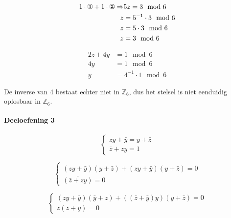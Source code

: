 \documentclass[12pt]{article}
\newcommand{\ov}[1]{\bar{#1}}
\begin{document}

	\begin{align}
		1 \cdot \text{\ding{172}} + 1 \cdot \text{\ding{173}} \Rightarrow & 5z = 3 \mod 6 \\
		z &= 5^{-1} \cdot 3 \mod 6 \\
		z &= 5 \cdot 3 \mod 6 \\
		z &= 3 \mod 6 \\
	\end{align}

	\begin{align}
		2z + 4y &= 1 \mod 6 \\
		4y &= 1 \mod 6 \\
		y &= 4^{-1} \cdot 1 \mod 6
	\end{align}

\par De inverse van 4 bestaat echter niet in $\mathbb{Z}_{6}$, dus het stelsel is niet eenduidig oplosbaar in $\mathbb{Z}_{6}$.

\clearpage

	\paragraph{Deeloefening 3}

	\begin{equation}
        \begin{cases}
            zy + \ov{y} = y + \ov{z} \\
            \ov{z} + zy = 1 
        \end{cases}
    \end{equation}

    \qquad \qquad \qquad \fbox{$f=g$ $\Rightarrow$ $f \ov{g} + \ov{g} f = 0 $}

    \begin{equation}
    	\begin{cases}
    		(zy+\ov{y})\overline{(y+\ov{z})}+\overline{(zy+\ov{y})}(y+\ov{z}) = 0 \\
    		\overline{(\ov{z}+zy)}=0
    	\end{cases}
    \end{equation}

    \begin{equation}
    	\begin{cases}
    		(zy+\ov{y})(\ov{y}+z)+((\ov{z}+\ov{y})y)(y+\ov{z}) = 0 \\
    		z(\ov{z}+\ov{y})=0
    	\end{cases}
    \end{equation}
\end{document}

